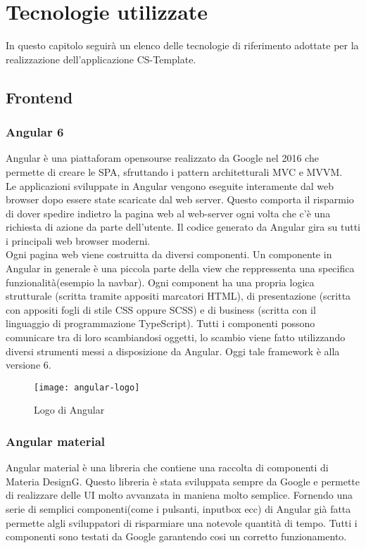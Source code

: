 
\chapter{Tecnologie utilizzate}
\label{cap:Tecnologie utilizzate}
In questo capitolo seguirà un elenco delle tecnologie di riferimento adottate per la realizzazione dell'applicazione CS-Template.
\section{Frontend}
\subsection{Angular 6}
Angular è una piattaforam opensourse realizzato da Google nel 2016 che permette di creare le SPA, sfruttando i
pattern architetturali MVC e MVVM.
\\

Le applicazioni sviluppate in Angular vengono eseguite interamente dal web browser dopo essere state scaricate dal web server. Questo comporta il risparmio di dover spedire indietro la pagina web al web-server ogni volta che c'è una richiesta di azione da parte dell'utente. Il codice generato da Angular gira su tutti i principali web browser moderni.
\\

Ogni pagina web viene costruitta da diversi componenti. Un componente in Angular in generale è una piccola parte della view che reppressenta una specifica funzionalità(esempio la navbar).   Ogni component ha una propria logica
strutturale (scritta tramite appositi marcatori HTML), di presentazione (scritta con
appositi fogli di stile CSS oppure SCSS) e di business (scritta con il linguaggio di programmazione
TypeScript). Tutti i componenti possono comunicare tra di loro scambiandosi
oggetti, lo scambio viene fatto utilizzando diversi strumenti messi a disposizione da Angular. Oggi tale framework è alla versione 6.
\begin{figure}[!h] 
	\centering 
	\texttt{[image: angular-logo]} 
	\caption{Logo di Angular}
\end{figure}

\subsection{Angular material}
Angular material è una libreria che contiene una raccolta di componenti di Materia DesignG. Questo libreria è stata sviluppata sempre da Google e permette di realizzare delle UI molto avvanzata in maniena molto semplice. Fornendo una serie di semplici componenti(come i pulsanti, inputbox ecc) di Angular già fatta permette algli sviluppatori di risparmiare una notevole quantità di tempo. Tutti i componenti sono testati da Google garantendo cosi un corretto funzionamento.

